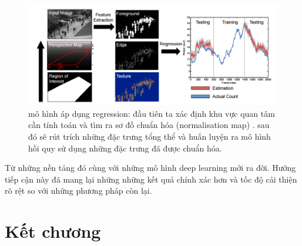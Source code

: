 \begin{figure}[t]
  			\begin{center}
    				\includegraphics[scale=0.45]{22}
    				\caption{mô hình áp dụng regression: đầu tiên ta xác định khu vực quan tâm cần tính toán và tìm ra sơ đồ chuẩn hóa (normalisation map) . sau đó sẽ rút trích những đặc trưng tổng thể và huấn luyện ra mô hình hồi quy sử dụng những đặc trưng đã được chuẩn hóa.} 
    				\label{22}
  			\end{center}
\end{figure} 

	Từ những nền tảng đó cùng với những mô hình deep learning mới ra đời. Hướng tiếp cận này đã mang lại những những kết quả chính xác hơn và tốc độ cải thiện rõ rệt so với những phương pháp còn lại.  
	
\section{Kết chương}
